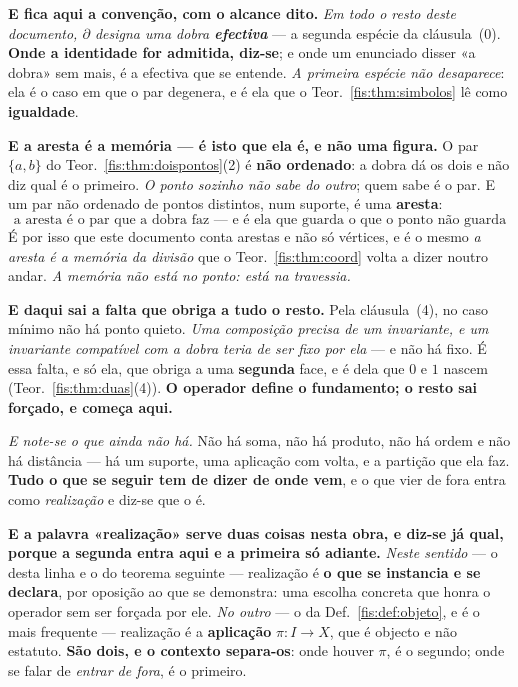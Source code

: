 \documentclass[livro.tex]{subfiles}
\begin{document}
\medskip\noindent\textbf{E fica aqui a convenção, com o alcance dito.} \emph{Em
todo o resto deste documento, $\partial$ designa uma dobra \textbf{efectiva}} ---
a segunda espécie da cláusula~(0). \textbf{Onde a identidade for admitida,
diz-se}; e onde um enunciado disser «a dobra» sem mais, é a efectiva que se
entende. \emph{A primeira espécie não desaparece}: ela é o caso em que o par
degenera, e é ela que o Teor.~\ref{fis:thm:simbolos} lê como \textbf{igualdade}.


\medskip\noindent\textbf{E a aresta é a memória --- é isto que ela é, e não uma
figura.} O par $\{a,b\}$ do Teor.~\ref{fis:thm:doispontos}(2) é \textbf{não
ordenado}: a dobra dá os dois e não diz qual é o primeiro. \emph{O ponto sozinho
não sabe do outro}; quem sabe é o par. E um par não ordenado de pontos
distintos, num suporte, é uma \textbf{aresta}:
\[
\boxed{\;\text{a aresta é o par que a dobra faz --- e é ela que guarda o que o ponto não guarda}\;}
\]
É por isso que este documento conta arestas e não só vértices, e é o mesmo
\emph{a aresta é a memória da divisão} que o Teor.~\ref{fis:thm:coord} volta a
dizer noutro andar. \emph{A memória não está no ponto: está na travessia.}

\medskip\noindent\textbf{E daqui sai a falta que obriga a tudo o resto.} Pela
cláusula~(4), no caso mínimo não há ponto quieto. \emph{Uma composição precisa de
um invariante, e um invariante compatível com a dobra teria de ser fixo por
ela} --- e não há fixo. É essa falta, e só ela, que obriga a uma
\textbf{segunda} face, e é dela que $0$ e $1$ nascem
(Teor.~\ref{fis:thm:duas}(4)). \textbf{O operador define o fundamento; o resto
sai forçado, e começa aqui.}

\medskip\noindent\emph{E note-se o que ainda não há.} Não há soma, não há
produto, não há ordem e não há distância --- há um suporte, uma aplicação com
volta, e a partição que ela faz. \textbf{Tudo o que se seguir tem de dizer de
onde vem}, e o que vier de fora entra como \emph{realização} e diz-se que o é.

\smallskip\noindent\textbf{E a palavra «realização» serve duas coisas nesta obra,
e diz-se já qual, porque a segunda entra aqui e a primeira só adiante.}
\emph{Neste sentido} --- o desta linha e o do teorema seguinte --- realização é
\textbf{o que se instancia e se declara}, por oposição ao que se demonstra: uma
escolha concreta que honra o operador sem ser forçada por ele. \emph{No outro}
--- o da Def.~\ref{fis:def:objeto}, e é o mais frequente --- realização é a
\textbf{aplicação} $\pi\colon I\to X$, que é objecto e não estatuto.
\textbf{São dois, e o contexto separa-os}: onde houver $\pi$, é o segundo; onde se
falar de \emph{entrar de fora}, é o primeiro.
\end{document}
